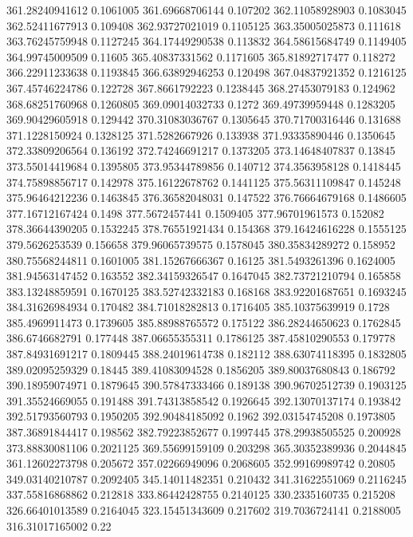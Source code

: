 361.28240941612 0.1061005
361.69668706144 0.107202
362.11058928903 0.1083045
362.52411677913 0.109408
362.93727021019 0.1105125
363.35005025873 0.111618
363.76245759948 0.1127245
364.17449290538 0.113832
364.58615684749 0.1149405
364.99745009509 0.11605
365.40837331562 0.1171605
365.81892717477 0.118272
366.22911233638 0.1193845
366.63892946253 0.120498
367.04837921352 0.1216125
367.45746224786 0.122728
367.8661792223 0.1238445
368.27453079183 0.124962
368.68251760968 0.1260805
369.09014032733 0.1272
369.49739959448 0.1283205
369.90429605918 0.129442
370.31083036767 0.1305645
370.71700316446 0.131688
371.1228150924 0.1328125
371.5282667926 0.133938
371.93335890446 0.1350645
372.33809206564 0.136192
372.74246691217 0.1373205
373.14648407837 0.13845
373.55014419684 0.1395805
373.95344789856 0.140712
374.3563958128 0.1418445
374.75898856717 0.142978
375.16122678762 0.1441125
375.56311109847 0.145248
375.96464212236 0.1463845
376.36582048031 0.147522
376.76664679168 0.1486605
377.16712167424 0.1498
377.5672457441 0.1509405
377.96701961573 0.152082
378.36644390205 0.1532245
378.76551921434 0.154368
379.16424616228 0.1555125
379.5626253539 0.156658
379.96065739575 0.1578045
380.35834289272 0.158952
380.75568244811 0.1601005
381.15267666367 0.16125
381.5493261396 0.1624005
381.94563147452 0.163552
382.34159326547 0.1647045
382.73721210794 0.165858
383.13248859591 0.1670125
383.52742332183 0.168168
383.92201687651 0.1693245
384.31626984934 0.170482
384.71018282813 0.1716405
385.10375639919 0.1728
385.4969911473 0.1739605
385.88988765572 0.175122
386.28244650623 0.1762845
386.6746682791 0.177448
387.06655355311 0.1786125
387.45810290553 0.179778
387.84931691217 0.1809445
388.24019614738 0.182112
388.63074118395 0.1832805
389.02095259329 0.18445
389.41083094528 0.1856205
389.80037680843 0.186792
390.18959074971 0.1879645
390.57847333466 0.189138
390.96702512739 0.1903125
391.35524669055 0.191488
391.74313858542 0.1926645
392.13070137174 0.193842
392.51793560793 0.1950205
392.90484185092 0.1962
392.03154745208 0.1973805
387.36891844417 0.198562
382.79223852677 0.1997445
378.29938505525 0.200928
373.88830081106 0.2021125
369.55699159109 0.203298
365.30352389936 0.2044845
361.12602273798 0.205672
357.02266949096 0.2068605
352.99169989742 0.20805
349.03140210787 0.2092405
345.14011482351 0.210432
341.31622551069 0.2116245
337.55816868862 0.212818
333.86442428755 0.2140125
330.2335160735 0.215208
326.66401013589 0.2164045
323.15451343609 0.217602
319.7036724141 0.2188005
316.31017165002 0.22
